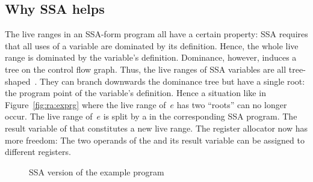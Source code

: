 {\subsection{Why SSA helps}

The live ranges in an SSA-form program all have a certain property:
SSA requires that all uses of a variable are dominated by its definition.
Hence, the whole live range is dominated by the variable's definition.
Dominance, however, induces a tree on the control flow graph.
Thus, the live ranges of SSA variables are all tree-shaped~\cite{bouchez,brisk:2006:poly,HGG:2006:RA_SSA}.
They can branch downwards the dominance tree but have a single root: the program point of the variable's definition.
Hence a situation like in Figure~\ref{fig:ra:exprg} where the live range of~$e$ has two ``roots'' can no longer occur.
The live range of~$e$ is split by a \phifun in the corresponding SSA program.
The result variable of that \phifun constitutes a new live range.
The register allocator now has more freedom:
The two operands of the \phifun and its result variable can be assigned to different registers.

\begin{figure}[htbp]
	\begin{center}
		\qquad
	\end{center}
	\caption{SSA version of the example program}
	\label{fig:ra:exprgssa}
\end{figure}

}
